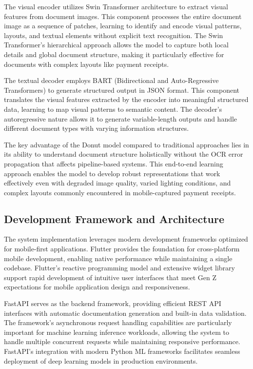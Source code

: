 The visual encoder utilizes Swin Transformer architecture to extract visual features from document images. This component processes the entire document image as a sequence of patches, learning to identify and encode visual patterns, layouts, and textual elements without explicit text recognition. The Swin Transformer's hierarchical approach allows the model to capture both local details and global document structure, making it particularly effective for documents with complex layouts like payment receipts.

The textual decoder employs BART (Bidirectional and Auto-Regressive Transformers) to generate structured output in JSON format. This component translates the visual features extracted by the encoder into meaningful structured data, learning to map visual patterns to semantic content. The decoder's autoregressive nature allows it to generate variable-length outputs and handle different document types with varying information structures.

The key advantage of the Donut model compared to traditional approaches lies in its ability to understand document structure holistically without the OCR error propagation that affects pipeline-based systems. This end-to-end learning approach enables the model to develop robust representations that work effectively even with degraded image quality, varied lighting conditions, and complex layouts commonly encountered in mobile-captured payment receipts.

\subsection{Development Framework and Architecture}
The system implementation leverages modern development frameworks optimized for mobile-first applications. Flutter provides the foundation for cross-platform mobile development, enabling native performance while maintaining a single codebase. Flutter's reactive programming model and extensive widget library support rapid development of intuitive user interfaces that meet Gen Z expectations for mobile application design and responsiveness.

FastAPI serves as the backend framework, providing efficient REST API interfaces with automatic documentation generation and built-in data validation. The framework's asynchronous request handling capabilities are particularly important for machine learning inference workloads, allowing the system to handle multiple concurrent requests while maintaining responsive performance. FastAPI's integration with modern Python ML frameworks facilitates seamless deployment of deep learning models in production environments.

